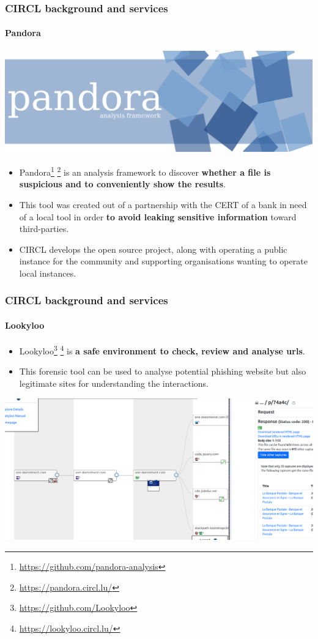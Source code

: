 \begin{frame}
    \frametitle{CIRCL background and services}
    \framesubtitle{Pandora}
    \begin{center}
        \includegraphics[width=0.5\linewidth]{pictures/pandora-logo.png}
    \end{center}
    \begin{itemize}
        \item Pandora\footnote{\url{https://github.com/pandora-analysis}} \footnote{\url{https://pandora.circl.lu/}} is an analysis framework to discover {\bf whether a file is suspicious and to conveniently show the results}.
        \item This tool was created out of a partnership with the CERT of a bank in need of a local tool in order {\bf to avoid leaking sensitive information} toward third-parties.
        \item CIRCL develops the open source project, along with operating a public instance for the community and supporting organisations wanting to operate local instances. 
    \end{itemize}
\end{frame}

\begin{frame}
    \frametitle{CIRCL background and services}
    \framesubtitle{Lookyloo}
\begin{itemize}
    \item Lookyloo\footnote{\url{https://github.com/Lookyloo}} \footnote{\url{https://lookyloo.circl.lu/}} is {\bf a safe environment to check, review and analyse urls}.
    \item This forensic tool can be used to analyse potential phishing website but also legitimate sites for understanding the interactions.
\end{itemize}
    \includegraphics[scale=0.18]{lapostale.png}
\end{frame}

